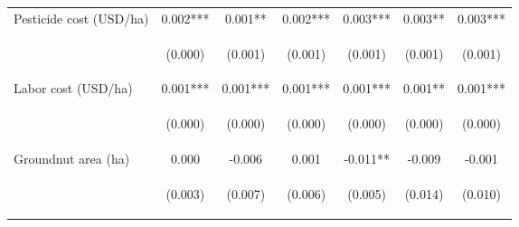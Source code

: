\begin{center}
\begin{tabular}{lcccccc}
Pesticide cost (USD/ha) & 0.002*** & 0.001** & 0.002*** & 0.003*** & 0.003** & 0.003*** \\
\vspace{4pt} & \begin{footnotesize}(0.000)\end{footnotesize} & \begin{footnotesize}(0.001)\end{footnotesize} & \begin{footnotesize}(0.001)\end{footnotesize} & \begin{footnotesize}(0.001)\end{footnotesize} & \begin{footnotesize}(0.001)\end{footnotesize} & \begin{footnotesize}(0.001)\end{footnotesize} \\
Labor cost (USD/ha) & 0.001*** & 0.001*** & 0.001*** & 0.001*** & 0.001** & 0.001*** \\
\vspace{4pt} & \begin{footnotesize}(0.000)\end{footnotesize} & \begin{footnotesize}(0.000)\end{footnotesize} & \begin{footnotesize}(0.000)\end{footnotesize} & \begin{footnotesize}(0.000)\end{footnotesize} & \begin{footnotesize}(0.000)\end{footnotesize} & \begin{footnotesize}(0.000)\end{footnotesize} \\
Groundnut area (ha) & 0.000 & -0.006 & 0.001 & -0.011** & -0.009 & -0.001 \\
\vspace{4pt} & \begin{footnotesize}(0.003)\end{footnotesize} & \begin{footnotesize}(0.007)\end{footnotesize} & \begin{footnotesize}(0.006)\end{footnotesize} & \begin{footnotesize}(0.005)\end{footnotesize} & \begin{footnotesize}(0.014)\end{footnotesize} & \begin{footnotesize}(0.010)\end{footnotesize} \\

\end{tabular}
\end{center}
